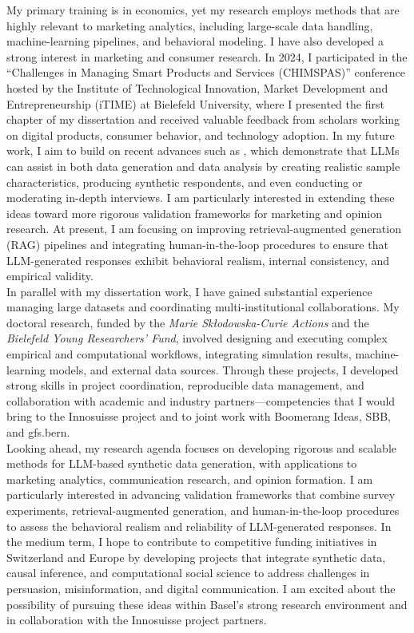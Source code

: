 \documentclass{nfr}
\begin{document}
My primary training is in economics, yet my research employs methods that are highly relevant to marketing analytics, including large-scale data handling, machine-learning pipelines, and behavioral modeling. 
I have also developed a strong interest in marketing and consumer research. 
In 2024, I participated in the “Challenges in Managing Smart Products and Services (CHIMSPAS)” conference hosted by the Institute of Technological Innovation, Market Development and Entrepreneurship (iTIME) at Bielefeld University, where I presented the first chapter of my dissertation and received valuable feedback from scholars working on digital products, consumer behavior, and technology adoption.
In my future work, I aim to build on recent advances such as \citet{arora2025ai}, which demonstrate that LLMs can assist in both data generation and data analysis by creating realistic sample characteristics, producing synthetic respondents, and even conducting or moderating in-depth interviews. 
I am particularly interested in extending these ideas toward more rigorous validation frameworks for marketing and opinion research. 
At present, I am focusing on improving retrieval-augmented generation (RAG) pipelines and integrating human-in-the-loop procedures to ensure that LLM-generated responses exhibit behavioral realism, internal consistency, and empirical validity.\\

In parallel with my dissertation work, I have gained substantial experience managing large datasets and coordinating multi-institutional collaborations. 
My doctoral research, funded by the \textit{Marie Skłodowska-Curie Actions} and the \textit{Bielefeld Young Researchers’ Fund}, involved designing and executing complex empirical and computational workflows, integrating simulation results, machine-learning models, and external data sources. 
Through these projects, I developed strong skills in project coordination, reproducible data management, and collaboration with academic and industry partners—competencies that I would bring to the Innosuisse project and to joint work with Boomerang Ideas, SBB, and gfs.bern.\\

Looking ahead, my research agenda focuses on developing rigorous and scalable methods for LLM-based synthetic data generation, with applications to marketing analytics, communication research, and opinion formation. 
I am particularly interested in advancing validation frameworks that combine survey experiments, retrieval-augmented generation, and human-in-the-loop procedures to assess the behavioral realism and reliability of LLM-generated responses. 
In the medium term, I hope to contribute to competitive funding initiatives in Switzerland and Europe by developing projects that integrate synthetic data, causal inference, and computational social science to address challenges in persuasion, misinformation, and digital communication. 
I am excited about the possibility of pursuing these ideas within Basel’s strong research environment and in collaboration with the Innosuisse project partners.\\
\end{document}
